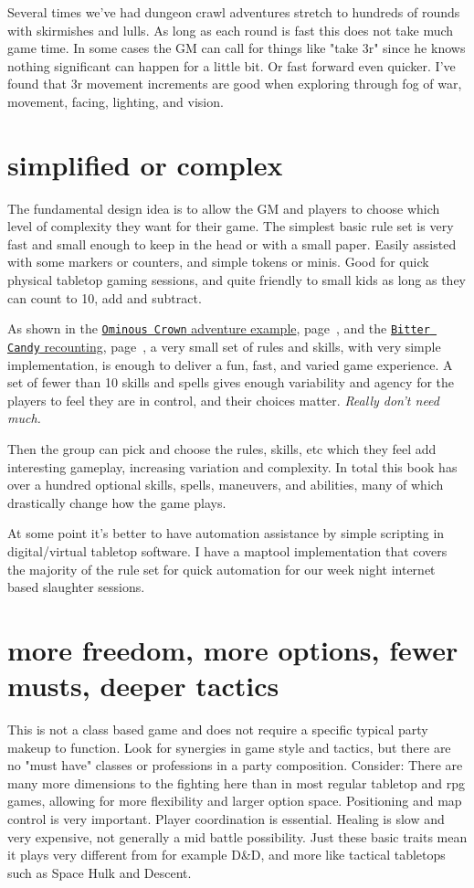 Several times we've had dungeon crawl adventures stretch to hundreds of rounds with skirmishes and lulls. As long as each round is fast this does not take much game time. In some cases the GM can call for things like "take 3r" since he knows nothing significant can happen for a little bit. Or fast forward even quicker. I've found that 3r movement increments are good when exploring through fog of war, movement, facing, lighting, and vision.


\section*{simplified or complex}
The fundamental design idea is to allow the GM and players to choose which level of complexity they want for their game. The simplest basic rule set is very fast and small enough to keep in the head or with a small paper. Easily assisted with some markers or counters, and simple tokens or minis. Good for quick physical tabletop gaming sessions, and quite friendly to small kids as long as they can count to 10, add and subtract.

As shown in the 
\hyperref[sec:basicenough]{\texttt{Ominous Crown} adventure example}, page~\pageref{sec:basicenough}, and the 
\hyperref[sec:youngkids]{\texttt{Bitter Candy} recounting}, page~\pageref{sec:youngkids}, 
a very small set of rules and skills, with very simple implementation, is enough to deliver a fun, fast, and varied game experience. A set of fewer than 10 skills and spells gives enough variability and agency for the players to feel they are in control, and their choices matter. \emph{Really don't need much.}

Then the group can pick and choose the rules, skills, etc which they feel add interesting gameplay, increasing variation and complexity. In total this book has over a hundred optional skills, spells, maneuvers, and abilities, many of which drastically change how the game plays.

At some point it's better to have automation assistance by simple scripting in digital/virtual tabletop software. I have a maptool implementation that covers the majority of the rule set for quick automation for our week night internet based slaughter sessions.


\section*{more freedom, more options, fewer musts, deeper tactics}
This is not a class based game and does not require a specific typical party makeup to function. Look for synergies in game style and tactics, but there are no "must have" classes or professions in a party composition. Consider: There are many more dimensions to the fighting here than in most regular tabletop and rpg games, allowing for more flexibility and larger option space. Positioning and map control is very important. Player coordination is essential. Healing is slow and very expensive, not generally a mid battle possibility. Just these basic traits mean it plays very different from for example D\&D, and more like tactical tabletops such as Space Hulk and Descent.


